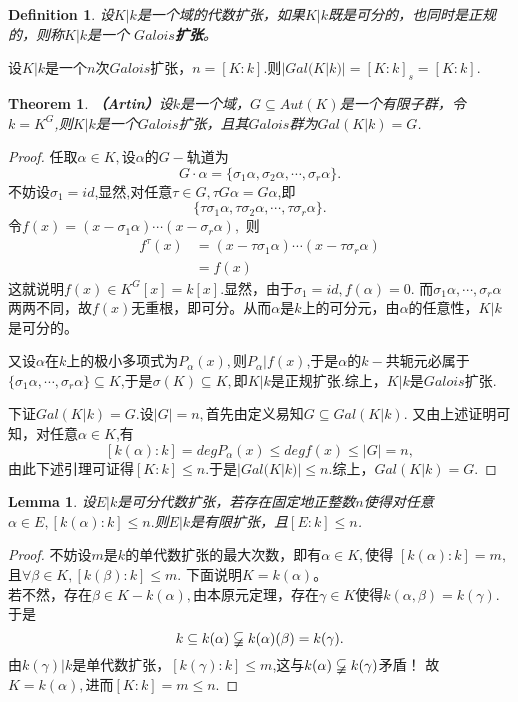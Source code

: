 \documentclass[UTF8]{article}
\newtheorem{thm}{Theorem}[section]
\newtheorem{defn}{Definition}[section]
\newtheorem{lem}{Lemma}[section]
\begin{document}
\begin{defn}
设$K|k$是一个域的代数扩张，如果$K|k$既是可分的，也同时是正规的，则称$K|k$是一个
\textbf{$Galois$扩张}。
\end{defn}
设$K|k$是一个$n$次$Galois$扩张，$n=[K:k]$.则$|Gal(K|k)|=[K:k]_{s}=[K:k]$.\\
\begin{thm}

\textbf{（Artin）}设$k$是一个域，$G\subseteq Aut(K)$是一个有限子群，令$k=K^{G}$,则$K|k$是一个$Galois$扩张，且其$Galois$群为$Gal(K|k)=G$.
\end{thm}
\begin{proof}
	任取$\alpha\in K,$设$\alpha$的$G-$轨道为
	$$
	G\cdot\alpha=\{\sigma_{1}\alpha,\sigma_{2}\alpha,\cdots,\sigma_{r}\alpha\}.
	$$
	不妨设$\sigma_{1}=id$,显然,对任意$\tau\in G,\tau G\alpha=G\alpha$,即
	$$
	\{\tau\sigma_{1}\alpha,\tau\sigma_{2}\alpha,\cdots,\tau\sigma_{r}\alpha\}.
	$$
	令$f(x)=(x-\sigma_{1}\alpha)\cdots(x-\sigma_{r}\alpha),$
	则
	\[\begin{split}
	f^{\tau}(x)&=(x-\tau\sigma_{1}\alpha)\cdots(x-\tau\sigma_{r}\alpha)\\
	&=f(x)
	\end{split}
	\]
	这就说明$f(x)\in K^{G}[x]=k[x].$显然，由于$\sigma_{1}=id,f(\alpha)=0.$
	而$\sigma_{1}\alpha,\cdots,\sigma_{r}\alpha$两两不同，故$f(x)$无重根，即可分。从而$\alpha$是$k$上的可分元，由$\alpha$的任意性，$K|k$是可分的。
	
	又设$\alpha$在$k$上的极小多项式为$P_{\alpha}(x),$则$P_{\alpha}|f(x)$,于是$\alpha$的$k-$共轭元必属于$\{\sigma_{1}\alpha,\cdots,\sigma_{r}\alpha\}\subseteq K$,于是$\sigma(K)\subseteq K,$即$K|k$是正规扩张.综上，$K|k$是$Galois$扩张.
	
	
	下证$Gal(K|k)=G$.设$|G|=n,$首先由定义易知$G\subseteq Gal(K|k).$
	又由上述证明可知，对任意$\alpha\in K$,有
	$$
	[k(\alpha):k]=degP_{\alpha}(x)\leq degf(x)\leq |G|=n,
	$$
	由此下述引理可证得$[K:k]\leq n$.于是$|Gal(K|k)|\leq n.$综上，$Gal(K|k)=G.$
\end{proof}

\begin{lem}设$E|k$是可分代数扩张，若存在固定地正整数$n$使得对任意
$\alpha\in E,[k(\alpha):k]\leq n.$则$E|k$是有限扩张，且$[E:k]\leq n$.
\end{lem}
\begin{proof}
	不妨设$m$是$k$的单代数扩张的最大次数，即有$\alpha\in K,$使得
	$[k(\alpha):k]=m,$且$\forall \beta \in K,[k(\beta):k]\leq m.$
	下面说明$K=k(\alpha)$。\\
	若不然，存在$\beta\in K-k(\alpha),$由本原元定理，存在$\gamma\in K$使得$k(\alpha,\beta)=k(\gamma).$于是
	$$
	k\subseteq k(\alpha)\varsubsetneqq k(\alpha)(\beta)=k(\gamma).
	$$
	由$k(\gamma)|k$是单代数扩张，$[k(\gamma):k]\leq m$,这与$k(\alpha)\varsubsetneqq k(\gamma)$矛盾！
	故$K=k(\alpha),$进而$[K:k]=m \leq n$.
\end{proof}
\end{document}
